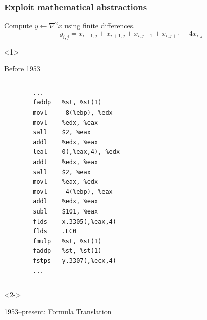 \documentclass[presentation, 10pt]{beamer}
\begin{document}
\begin{frame}[fragile]
  \frametitle{Exploit mathematical abstractions}
  Compute $y \leftarrow \nabla^2 x$ using finite differences.
  \begin{equation*}
    y_{i,j} = x_{i-1, j} + x_{i+1, j} + x_{i, j-1} + x_{i, j+1} - 4x_{i,j}    
  \end{equation*}
  \begin{overlayarea}{\textwidth}{0.8\textheight}
  \begin{onlyenv}<1>
    \begin{block}{Before 1953}
      \vspace{1em}
      \begin{columns}
        \begin{column}{0.5\textwidth}
\begin{verbatim}
        ...
        faddp   %st, %st(1)
        movl    -8(%ebp), %edx
        movl    %edx, %eax
        sall    $2, %eax
        addl    %edx, %eax
        leal    0(,%eax,4), %edx
        addl    %edx, %eax
        sall    $2, %eax
        movl    %eax, %edx
        movl    -4(%ebp), %eax
        addl    %edx, %eax
        subl    $101, %eax
        flds    x.3305(,%eax,4)
        flds    .LC0
        fmulp   %st, %st(1)
        faddp   %st, %st(1)
        fstps   y.3307(,%ecx,4)
        ...
\end{verbatim}
        \end{column}
        \begin{column}{0.5\textwidth}
        \end{column}
      \end{columns}
    \end{block}
  \end{onlyenv}
  \begin{onlyenv}<2->
    \begin{block}{1953--present: Formula Translation}
      \vspace{1em}
      \begin{columns}

\end{columns}
\end{block}
\end{onlyenv}
\end{overlayarea}
\end{frame}
\end{document}
